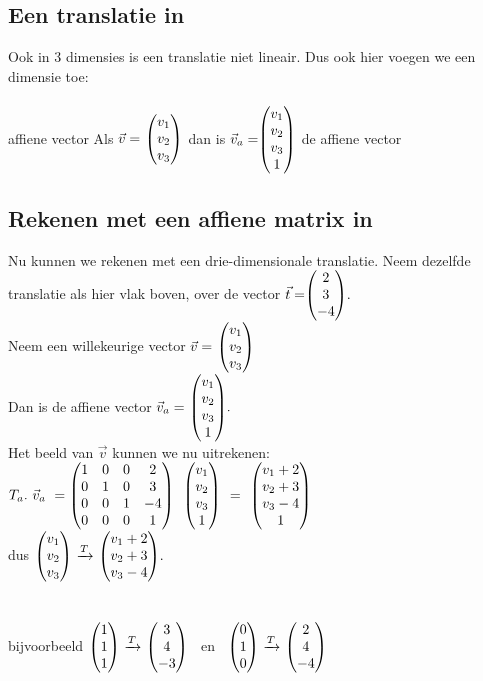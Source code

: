 \subsection{Een translatie in \RD}
Ook in 3 dimensies is een translatie niet lineair. Dus ook hier voegen we een dimensie toe:
\\
\\          
\mydef 
{affiene vector}
{ Als $\vec{v} = \ \vecdriesnel{v} $ \quad dan is \quad 
	$\vec{v}_a = \vecvier{v_1} {v_2} {v_3} {1}  $ \quad de affiene vector }\\


\subsection{Rekenen met een affiene  matrix in \RD}
Nu kunnen we rekenen met een drie-dimensionale translatie.
Neem dezelfde translatie als hier vlak boven, over de vector $ \vec{t}=  \vecdrie{2}{3}{-4}. $ \\
Neem een willekeurige  vector $\vec{v} = \ \vecdriesnel{v} $\\  Dan is de affiene vector  $\vec{v}_a = \  \vecvier{v_1} {v_2} {v_3} {1} . $\\ 
Het beeld van $\vec{v} $ kunnen we nu uitrekenen: \\
$ T_a  . \ \vec{v}_a \ 
=   \matvier{ 1 & 0 & 0 & 2} 
{ 0 & 1 & 0 &  3}  
{ 0 & 0 & 1 &  -4 } 
{0 & 0 &  0 & 1 } \ \  \vecvier{v_1} {v_2} {v_3} {1} \ \ 
= \ \  \vecvier{v_1 + 2} {v_2 + 3 } {v_3 - 4 } {1} $ \\
dus 
\quad \quad \quad $ \vecdriesnel{v}  \  \xrightarrow{T}   \   \vecdrie{v_1+2} {v_2+3} {v_3-4} . $ 
\\ \\ \\
bijvoorbeeld 
$ \vecdrie{1}{1}{1}  \  \xrightarrow{T}   \   \vecdrie{3} {4} {-3} $ \ \quad en \
\quad $ \vecdrie{0}{1}{0}  \  \xrightarrow{T}   \   \vecdrie{2} {4} {-4} $ 

